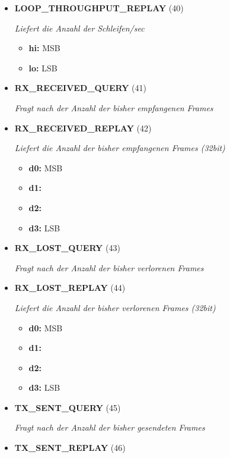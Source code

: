 \begin{itemize}
\item \textbf{LOOP\_THROUGHPUT\_REPLAY} (40)

\textit{Liefert die Anzahl der Schleifen/sec}

\small
\begin{itemize}
		
\item \textbf{hi:} MSB
\item \textbf{lo:} LSB
\end{itemize}
\normalsize
	
\item \textbf{RX\_RECEIVED\_QUERY} (41)

\textit{Fragt nach der Anzahl der bisher empfangenen Frames}

\item \textbf{RX\_RECEIVED\_REPLAY} (42)

\textit{Liefert die Anzahl der bisher empfangenen Frames (32bit)}

\small
\begin{itemize}
		
\item \textbf{d0:} MSB
\item \textbf{d1:} 
\item \textbf{d2:} 
\item \textbf{d3:} LSB
\end{itemize}
\normalsize
	
\item \textbf{RX\_LOST\_QUERY} (43)

\textit{Fragt nach der Anzahl der bisher verlorenen Frames}

\item \textbf{RX\_LOST\_REPLAY} (44)

\textit{Liefert die Anzahl der bisher verlorenen Frames (32bit)}

\small
\begin{itemize}
		
\item \textbf{d0:} MSB
\item \textbf{d1:} 
\item \textbf{d2:} 
\item \textbf{d3:} LSB
\end{itemize}
\normalsize
	
\item \textbf{TX\_SENT\_QUERY} (45)

\textit{Fragt nach der Anzahl der bisher gesendeten Frames}

\item \textbf{TX\_SENT\_REPLAY} (46)


\end{itemize}

